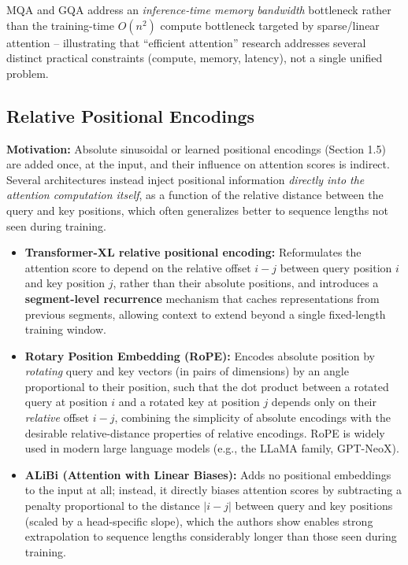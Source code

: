 \documentclass[11pt]{article}
\begin{document}
\begin{keyidea}
MQA and GQA address an \emph{inference-time memory bandwidth} bottleneck rather than the training-time $O(n^2)$ compute bottleneck targeted by sparse/linear attention -- illustrating that ``efficient attention'' research addresses several distinct practical constraints (compute, memory, latency), not a single unified problem.
\end{keyidea}

\subsection*{Relative Positional Encodings}

\textbf{Motivation:} Absolute sinusoidal or learned positional encodings (Section 1.5) are added once, at the input, and their influence on attention scores is indirect. Several architectures instead inject positional information \emph{directly into the attention computation itself}, as a function of the relative distance between the query and key positions, which often generalizes better to sequence lengths not seen during training.

\begin{itemize}[leftmargin=1.5em]
    \item \textbf{Transformer-XL relative positional encoding:} Reformulates the attention score to depend on the relative offset $i-j$ between query position $i$ and key position $j$, rather than their absolute positions, and introduces a \textbf{segment-level recurrence} mechanism that caches representations from previous segments, allowing context to extend beyond a single fixed-length training window.
    \item \textbf{Rotary Position Embedding (RoPE):} Encodes absolute position by \emph{rotating} query and key vectors (in pairs of dimensions) by an angle proportional to their position, such that the dot product between a rotated query at position $i$ and a rotated key at position $j$ depends only on their \emph{relative} offset $i-j$, combining the simplicity of absolute encodings with the desirable relative-distance properties of relative encodings. RoPE is widely used in modern large language models (e.g., the LLaMA family, GPT-NeoX).
    \item \textbf{ALiBi (Attention with Linear Biases):} Adds no positional embeddings to the input at all; instead, it directly biases attention scores by subtracting a penalty proportional to the distance $|i-j|$ between query and key positions (scaled by a head-specific slope), which the authors show enables strong extrapolation to sequence lengths considerably longer than those seen during training.
\end{itemize}
\end{document}
